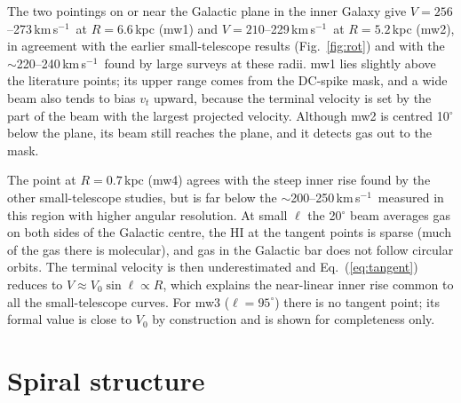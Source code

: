 \documentclass[aip,apl,reprint,amsmath,amssymb]{revtex4-2}
\newcommand{\kms}{km\,s$^{-1}$}
\begin{document}
The two pointings on or near the Galactic plane in the inner Galaxy give $V = 256$--273\,\kms\ at $R = 6.6$\,kpc (mw1) and $V = 210$--229\,\kms\ at $R = 5.2$\,kpc (mw2), in agreement with the earlier small-telescope results (Fig.~\ref{fig:rot}) and with the $\sim$220--240\,\kms\ found by large surveys at these radii.\cite{Sofue2009,Reid2014} mw1 lies slightly above the literature points; its upper range comes from the DC-spike mask, and a wide beam also tends to bias $v_t$ upward, because the terminal velocity is set by the part of the beam with the largest projected velocity. Although mw2 is centred 10$^\circ$ below the plane, its beam still reaches the plane, and it detects gas out to the mask.

The point at $R = 0.7$\,kpc (mw4) agrees with the steep inner rise found by the other small-telescope studies, but is far below the $\sim$200--250\,\kms\ measured in this region with higher angular resolution.\cite{Sofue2009} At small $\ell$ the 20$^\circ$ beam averages gas on both sides of the Galactic centre, the HI at the tangent points is sparse (much of the gas there is molecular), and gas in the Galactic bar does not follow circular orbits. The terminal velocity is then underestimated and Eq.~(\ref{eq:tangent}) reduces to $V \approx V_0 \sin\ell \propto R$, which explains the near-linear inner rise common to all the small-telescope curves. For mw3 ($\ell = 95^\circ$) there is no tangent point; its formal value is close to $V_0$ by construction and is shown for completeness only.

\section{Spiral structure}
\end{document}
